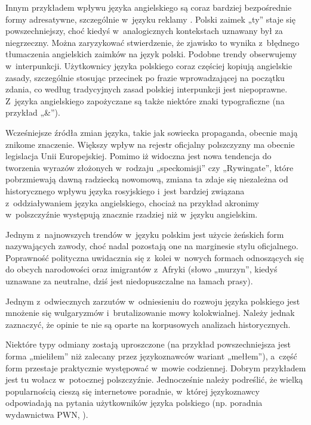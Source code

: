 \begin{multicols}{2}
Innym przykładem wpływu języka angielskiego są coraz bardziej
bezpośrednie formy adresatywne, szczególnie w~języku reklamy
\cite{Chlopicki2000}. Polski zaimek „ty” staje się
powszechniejszy, choć kiedyś w~analogicznych kontekstach uznawany
był za niegrzeczny. Można zaryzykować stwierdzenie, że zjawisko to
wynika z~błędnego tłumaczenia angielskich zaimków na język
polski. Podobne trendy obserwujemy w~interpunkcji. Użytkownicy
języka polskiego coraz częściej kopiują angielskie zasady,
szczególnie stosując przecinek po frazie wprowadzającej na
początku zdania, co według tradycyjnych zasad polskiej interpunkcji
jest niepoprawne. Z~języka angielskiego zapożyczane są także
niektóre znaki typograficzne (na przykład „\&”). 

Wcześniejsze źródła zmian języka, takie jak sowiecka propaganda,
obecnie mają znikome znaczenie. Większy wpływ na rejestr oficjalny
polszczyzny ma obecnie legislacja Unii Europejskiej. Pomimo iż
widoczna jest nowa tendencja do tworzenia wyrazów złożonych
w~rodzaju „speckomisji” czy „Rywingate”, które pobrzmiewają
dawną radziecką nowomową, zmiana ta zdaje się niezależna od
historycznego wpływu języka rosyjskiego i~jest bardziej związana
z~oddziaływaniem języka angielskiego, chociaż na przykład akronimy
w~polszczyźnie występują znacznie rzadziej niż w~języku
angielskim. 


Jednym z~najnowszych trendów w~języku polskim jest użycie
żeńskich form nazywających zawody, choć nadal pozostają one na
marginesie stylu oficjalnego. Poprawność polityczna uwidacznia się
z~kolei w~nowych formach odnoszących się do obcych narodowości oraz
imigrantów z~Afryki (słowo „murzyn”, kiedyś uznawane za
neutralne, dziś jest niedopuszczalne na łamach prasy). 

Jednym z~odwiecznych zarzutów w~odniesieniu do rozwoju języka
polskiego jest mnożenie się wulgaryzmów i~brutalizowanie mowy
kolokwialnej. Należy jednak zaznaczyć, że opinie te nie są oparte
na korpusowych analizach historycznych. 

Niektóre typy odmiany zostają uproszczone (na przykład
powszechniejsza jest forma „mieliłem” niż zalecany przez
językoznawców wariant „mełłem”), a~część form przestaje
praktycznie występować w~mowie codziennej. Dobrym przykładem jest
tu wołacz w~potocznej polszczyźnie. Jednocześnie należy
podreślić, że wielką popularnością cieszą się internetowe
poradnie, w~której językoznawcy odpowiadają na pytania
użytkowników języka polskiego (np. poradnia wydawnictwa PWN,
\cite{poradniapwn}). 


\end{multicols}
